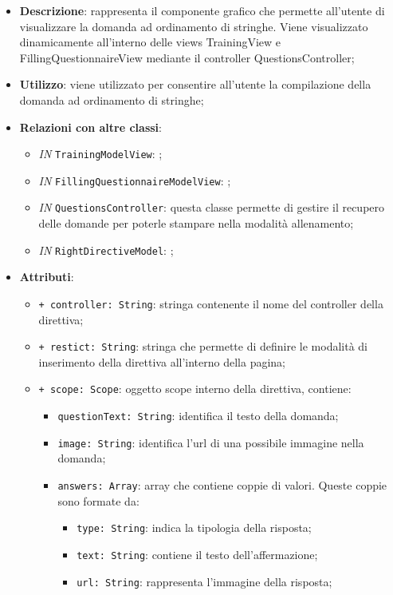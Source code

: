 		\begin{itemize}
			\item \textbf{Descrizione}: rappresenta il componente grafico che permette all'utente di visualizzare la domanda ad ordinamento di stringhe. Viene visualizzato dinamicamente all'interno delle views TrainingView e FillingQuestionnaireView mediante il controller QuestionsController;
			\item \textbf{Utilizzo}: viene utilizzato per consentire all'utente la compilazione della domanda ad ordinamento di stringhe;
			\item \textbf{Relazioni con altre classi}: 
			\begin{itemize}
				\item \textit{IN} \texttt{TrainingModelView}: ; 
				\item \textit{IN} \texttt{FillingQuestionnaireModelView}: ;
				\item \textit{IN} \texttt{QuestionsController}: questa classe permette di gestire il recupero delle domande per poterle stampare nella modalità allenamento;
				\item \textit{IN} \texttt{RightDirectiveModel}: ;
			\end{itemize}
			\item \textbf{Attributi}: 
			\begin{itemize}
				\item \texttt{+ controller: String}: stringa contenente il nome del controller della direttiva;
				\item \texttt{+ restict: String}: stringa che permette di definire le modalità di inserimento della direttiva all'interno della pagina;
				\item \texttt{+ scope: Scope}: oggetto scope interno della direttiva, contiene:
				\begin{itemize}
					\item \texttt{questionText: String}: identifica il testo della domanda;
					\item \texttt{image: String}: identifica l'url di una possibile immagine nella domanda;
					\item \texttt{answers: Array}: array che contiene coppie di valori. Queste coppie sono formate da:
					\begin{itemize}
						\item \texttt{type: String}: indica la tipologia della risposta;
						\item \texttt{text: String}: contiene il testo dell'affermazione;
						\item \texttt{url: String}: rappresenta l'immagine della risposta;

\end{itemize}
\end{itemize}
\end{itemize}
\end{itemize}
